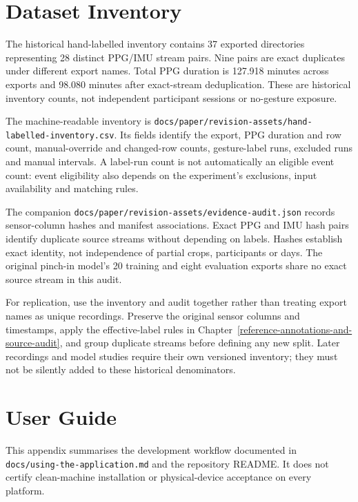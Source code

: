 \chapter{Dataset Inventory}

The historical hand-labelled inventory contains 37 exported directories representing 28 distinct PPG/IMU stream pairs. Nine pairs are exact duplicates under different export names. Total PPG duration is 127.918 minutes across exports and 98.080 minutes after exact-stream deduplication. These are historical inventory counts, not independent participant sessions or no-gesture exposure.

The machine-readable inventory is \nolinkurl{docs/paper/revision-assets/hand-labelled-inventory.csv}. Its fields identify the export, PPG duration and row count, manual-override and changed-row counts, gesture-label runs, excluded runs and manual intervals. A label-run count is not automatically an eligible event count: event eligibility also depends on the experiment's exclusions, input availability and matching rules.

The companion \nolinkurl{docs/paper/revision-assets/evidence-audit.json} records sensor-column hashes and manifest associations. Exact PPG and IMU hash pairs identify duplicate source streams without depending on labels. Hashes establish exact identity, not independence of partial crops, participants or days. The original pinch-in model's 20 training and eight evaluation exports share no exact source stream in this audit.

For replication, use the inventory and audit together rather than treating export names as unique recordings. Preserve the original sensor columns and timestamps, apply the effective-label rules in Chapter~\ref{reference-annotations-and-source-audit}, and group duplicate streams before defining any new split. Later recordings and model studies require their own versioned inventory; they must not be silently added to these historical denominators.

\chapter{User Guide}

This appendix summarises the development workflow documented in \nolinkurl{docs/using-the-application.md} and the repository README. It does not certify clean-machine installation or physical-device acceptance on every platform.


